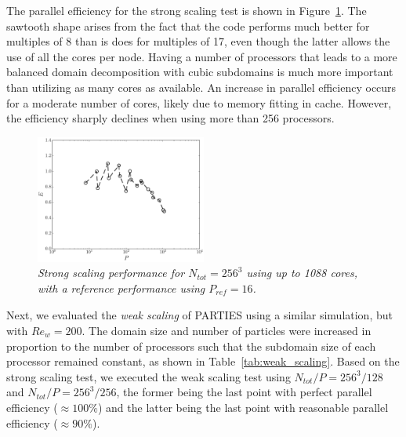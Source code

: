 \documentclass[10pt]{article}
\begin{document}
The parallel efficiency for the strong scaling test is shown in Figure~\ref{fig:strong_scaling}.  The sawtooth shape arises from the fact that the code performs much better for multiples of 8 than is does for multiples of 17, even though the latter allows the use of all the cores per node.  Having a number of processors that leads to a more balanced domain decomposition with cubic subdomains is much more important than utilizing as many cores as available.  An increase in parallel efficiency occurs for a moderate number of cores, likely due to memory fitting in cache.  However, the efficiency sharply declines when using more than 256 processors.

\begin{figure}[t]
\centering
\includegraphics[width=0.5\textwidth]{Figures/strong_scaling.pdf}
\caption{\small \textit{Strong scaling performance for $N_{tot} = 256^3$ using up to 1088 cores, with a reference performance using $P_\mathit{ref} = 16$.}}
\label{fig:strong_scaling}
\end{figure}

Next, we evaluated the \textit{weak scaling} of PARTIES using a similar simulation, but with $Re_w = 200$.  The domain size and number of particles were increased in proportion to the number of processors such that the subdomain size of each processor remained constant, as shown in Table~\ref{tab:weak_scaling}.  Based on the strong scaling test, we executed the weak scaling test using $N_\mathit{tot}/P = 256^3/128$ and $N_\mathit{tot}/P = 256^3/256$, the former being the last point with perfect parallel efficiency ($\approx 100\%$) and the latter being the last point with reasonable parallel efficiency ($\approx 90\%$).
\end{document}
